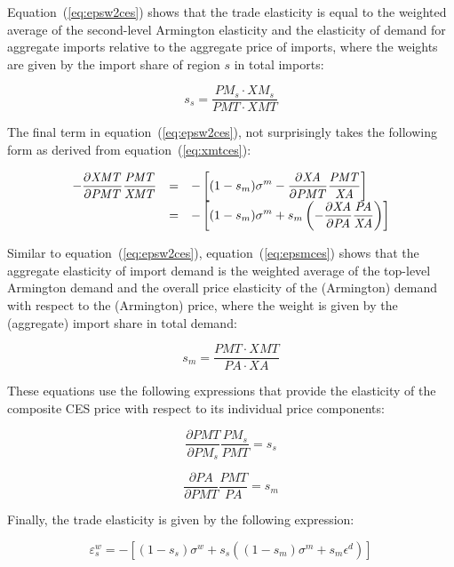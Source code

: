 \noindent Equation~(\ref{eq:epsw2ces}) shows that the trade elasticity is equal to the weighted average of the second-level Armington elasticity and the elasticity of demand for aggregate imports relative to the aggregate price of imports, where the weights are given by the import share of region $s$ in total imports:

\[
s_s = \frac{\mathit{PM_s} \cdot \mathit{XM_s}}{\mathit{PMT} \cdot \mathit{XMT}}
\]

The final term in equation~(\ref{eq:epsw2ces}), not surprisingly takes the following form as derived from equation~(\ref{eq:xmtces}):

\begin{equation}
\label{eq:epsmces}
\begin{array}{l c l}
\displaystyle -\frac{\partial \mathit{XMT}}{\partial \mathit{PMT}}
\frac{\mathit{PMT}}{\mathit{XMT}} & = & \displaystyle
 -\left[(1-s_m)\sigma^m - \frac{\partial \mathit{XA}}{\partial \mathit{PMT}}
\frac{\mathit{PMT}}{\mathit{XA}} \right] \\
{} & = &\displaystyle -\left[(1-s_m)\sigma^m + s_m \left(-\frac{\partial \mathit{XA}}{\partial \mathit{PA}}
\frac{\mathit{PA}}{\mathit{XA}}\right) \right]
\end{array}
\end{equation}

Similar to equation~(\ref{eq:epsw2ces}), equation~(\ref{eq:epsmces}) shows that the aggregate elasticity of import demand is the weighted average of the top-level Armington demand and the overall price elasticity of the (Armington) demand with respect to the (Armington) price, where the weight is given by the (aggregate) import share in total demand:

\[
s_m = \frac{\mathit{PMT} \cdot \mathit{XMT}}{\mathit{PA} \cdot \mathit{XA}}
\]

\noindent These equations use the following expressions that provide the elasticity of the composite CES price with respect to its individual price components:

\[
\frac{\partial \mathit{PMT}}{\partial \mathit{PM_s}}
\frac{\mathit{PM_s}}{\mathit{PMT}} = s_s
\]

\[
\frac{\partial \mathit{PA}}{\partial \mathit{PMT}}
\frac{\mathit{PMT}}{\mathit{PA}} = s_m
\]

Finally, the trade elasticity is given by the following expression:

\begin{equation}
\label{eq:epsw3ces}
\varepsilon^w_s = -\left[ (1-s_s) \sigma^w + s_s\left( (1-s_m)\sigma^m + s_m \epsilon^d\right)\right]
\end{equation}


